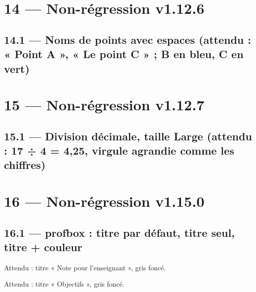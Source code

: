 \documentclass[12pt]{extarticle}
\begin{document}
\division[dividende=1236, diviseur=12, solution, etapes={12, 36}]

\section*{14 — Non-régression v1.12.6}

\subsection*{14.1 — Noms de points avec espaces (attendu : « Point A », « Le point C » ; B en bleu, C en vert)}

\reperegradue[bg={(-1,-1)}, hd={(5,5)},
    points={Point A/(1,2), B/( 3 , 4 )/blue ,  Le point C /(4,1)/green, }]

\section*{15 — Non-régression v1.12.7}

\subsection*{15.1 — Division décimale, taille Large (attendu : 17 ÷ 4 = 4,25, virgule agrandie comme les chiffres)}

\division[dividende=17, diviseur=4, decimales=2, solution, taille=Large]

\section*{16 — Non-régression v1.15.0}

\subsection*{16.1 — profbox : titre par défaut, titre seul, titre + couleur}

\begin{profbox}
    Attendu : titre « Note pour l'enseignant », gris foncé.
\end{profbox}

\begin{profbox}[Objectifs]
    Attendu : titre « Objectifs », gris foncé.
\end{profbox}
\end{document}
